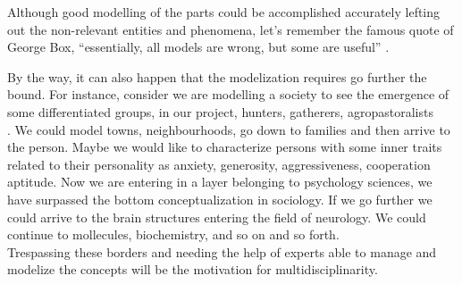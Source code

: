 \documentclass[11pt,oneside,a4paper,openright]{report}
\begin{document}
% 
%

Although good modelling of the parts could be accomplished accurately lefting out the non-relevant entities and phenomena, let's remember the famous quote of George Box, ``essentially, all models are wrong, but some are useful'' \cite[p.2]{Box1979}.
\\ 


By the way, it can also happen that the modelization requires go further the bound. For instance, consider we are modelling a society to see the emergence of some differentiated groups, in our project, hunters, gatherers, agropastoralists \\ . We could model towns, neighbourhoods, go down to families and then arrive to the person. Maybe we would like to characterize persons with some inner traits related to their personality as anxiety, generosity, aggressiveness, cooperation aptitude. Now we are entering in a layer belonging to psychology sciences, we have surpassed the bottom conceptualization in sociology. If we go further we could arrive to the brain structures entering the field of neurology. We could continue to mollecules, biochemistry, and so on and so forth\cite[p.56]{MWilliams1999}.\\
Trespassing these borders and needing the help of experts able to manage and modelize the concepts will be the motivation for multidisciplinarity. 

\end{document}
